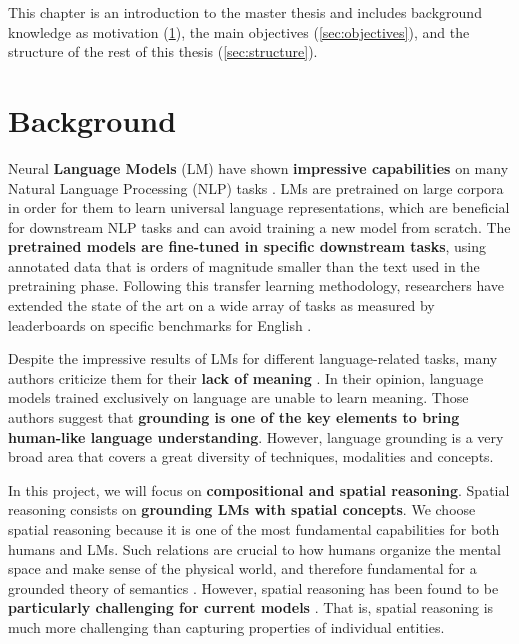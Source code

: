 This chapter is an introduction to the master thesis and includes background knowledge as motivation (\cref{sec:background}), the main objectives (\cref{sec:objectives}), and the structure of the rest of this thesis (\cref{sec:structure}).

\section{Background} \label{sec:background}

Neural \textbf{Language Models} (LM) have shown \textbf{impressive capabilities} on many Natural Language Processing (NLP) tasks \cite{wang2019superglue, brown2020language, chowdhery2022palm}. LMs are pretrained on large corpora in order for them to learn universal language representations, which are beneficial for downstream NLP tasks and can avoid training a new model from scratch. The \textbf{pretrained models are fine-tuned in specific downstream tasks}, using annotated data that is orders of magnitude smaller than the text used in the pretraining phase. Following this transfer learning methodology, researchers have extended the state of the art on a wide array of tasks as measured by leaderboards on specific benchmarks for English \cite{bommasani2021opportunities, wang2019superglue}.

Despite the impressive results of LMs for different language-related tasks, many authors criticize them for their \textbf{lack of meaning} \cite{bender2020climbing, bender2021dangers}. In their opinion, language models trained exclusively on language are unable to learn meaning. Those authors suggest that \textbf{grounding is one of the key elements to bring human-like language understanding}. However, language grounding is a very broad area that covers a great diversity of techniques, modalities and concepts. 

In this project, we will focus on \textbf{compositional and spatial reasoning}. Spatial reasoning consists on \textbf{grounding LMs with spatial concepts}. We choose spatial reasoning because it is one of the most fundamental capabilities for both humans and LMs. Such relations are crucial to how humans organize the mental space and make sense of the physical world, and therefore fundamental for a grounded theory of semantics \cite{levinson2003space}. However, spatial reasoning has been found to be \textbf{particularly challenging for current models} \cite{akula2020words}. That is, spatial reasoning is much more challenging than capturing properties of individual entities.

